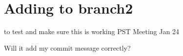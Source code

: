 \documentclass{article}
\begin{document}
\section{Adding to branch2}
to test and make sure this is working PST Meeting Jan 24

Will it add my commit message correctly?
\end{document}
